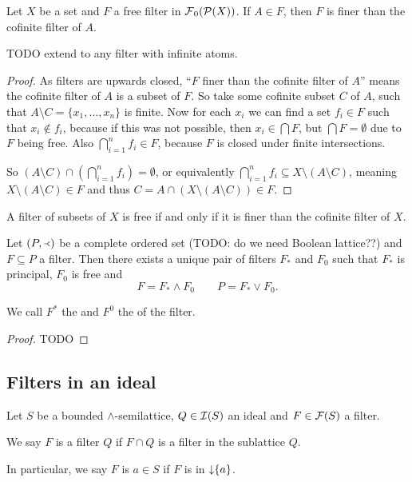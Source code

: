 \begin{proposition}
Let $X$ be a set and $F$ a free filter in $\operatorname{\mathcal{F}}_0(\operatorname{\mathcal{P}}(X))$. If $A\in F$, then $F$ is finer than the cofinite filter of $A$.
\end{proposition}
TODO extend to any filter with infinite atoms.
\begin{proof}
As filters are upwards closed, ``$F$ finer than the cofinite filter of $A$'' means the cofinite filter of $A$ is a subset of $F$. So take some cofinite subset $C$ of $A$, such that $A\setminus C = \{x_1, \ldots, x_n\}$ is finite. Now for each $x_i$ we can find a set $f_i\in F$ such that $x_i\notin f_i$, because if this was not possible, then $x_i \in \bigcap F$, but $\bigcap F = \emptyset$ due to $F$ being free. Also $\bigcap_{i=1}^n f_i \in F$, because $F$ is closed under finite intersections.

So $(A\setminus C)\cap (\bigcap_{i=1}^n f_i) = \emptyset$, or equivalently $\bigcap_{i=1}^n f_i \subseteq X\setminus (A\setminus C)$, meaning $X\setminus (A\setminus C) \in F$ and thus $C = A\cap (X\setminus (A\setminus C)) \in F$.
\end{proof}
\begin{corollary} \label{filterFreeIFFfinerThanCofinite}
A filter of subsets of $X$ is free \textup{if and only if} it is finer than the cofinite filter of $X$.
\end{corollary}

\begin{proposition}
Let $\left( P,\Yleft \right)$ be a complete ordered set (TODO: do we need Boolean lattice??) and $F\subseteq P$ a filter. Then there exists a unique pair of filters $F_*$ and $F_0$ such that $F_*$ is principal, $F_0$ is free and
\[ F = F_* \wedge F_0 \qquad P = F_* \vee F_0. \]
\end{proposition}
We call $F^*$ the  and $F^0$ the  of the filter.
\begin{proof}
TODO
\end{proof}

\subsection{Filters in an ideal}
\begin{definition}
Let $S$ be a bounded $\wedge$-semilattice, $Q\in\operatorname{\mathcal{I}}(S)$ an ideal and $F\in\operatorname{\mathcal{F}}(S)$ a filter.

We say $F$ is a filter  $Q$ if $F\cap Q$ is a filter in the sublattice $Q$.

In particular, we say $F$ is  $a\in S$ if $F$ is in $\operatorname{\downarrow}\{a\}$. 
\end{definition}

